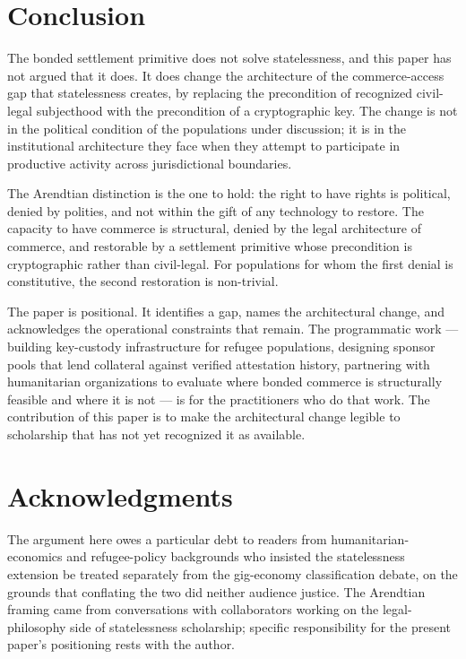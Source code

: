 \documentclass[11pt,a4paper]{article}
\theoremstyle{remark}
\begin{document}
\section{Conclusion}
\label{sec:conclusion}

The bonded settlement primitive does not solve statelessness, and
this paper has not argued that it does. It does change the
architecture of the commerce-access gap that statelessness
creates, by replacing the precondition of recognized
civil-legal subjecthood with the precondition of a cryptographic
key. The change is not in the political condition of the
populations under discussion; it is in the institutional
architecture they face when they attempt to participate in
productive activity across jurisdictional boundaries.

The Arendtian distinction is the one to hold: the right to have
rights is political, denied by polities, and not within the gift
of any technology to restore. The capacity to have commerce is
structural, denied by the legal architecture of commerce, and
restorable by a settlement primitive whose precondition is
cryptographic rather than civil-legal. For populations for whom
the first denial is constitutive, the second restoration is
non-trivial.

The paper is positional. It identifies a gap, names the
architectural change, and acknowledges the operational
constraints that remain. The programmatic work --- building
key-custody infrastructure for refugee populations, designing
sponsor pools that lend collateral against verified attestation
history, partnering with humanitarian organizations to evaluate
where bonded commerce is structurally feasible and where it is
not --- is for the practitioners who do that work. The
contribution of this paper is to make the
architectural change legible to scholarship that has not yet
recognized it as available.

\section*{Acknowledgments}
The argument here owes a particular debt to readers from
humanitarian-economics and refugee-policy backgrounds who
insisted the statelessness extension be treated separately from
the gig-economy classification debate, on the grounds that
conflating the two did neither audience justice. The Arendtian framing came from
conversations with collaborators working on the legal-philosophy
side of statelessness scholarship; specific responsibility for the
present paper's positioning rests with the author.
\end{document}
